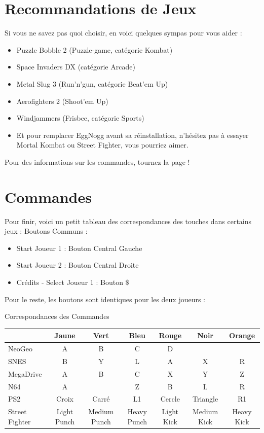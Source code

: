 \documentclass{article}
\begin{document}
\section*{Recommandations de Jeux}
Si vous ne savez pas quoi choisir, en voici quelques sympas pour vous aider : 
\begin{itemize}
    \item Puzzle Bobble 2 (Puzzle-game, catégorie Kombat)
    \item Space Invaders DX (catégorie Arcade)
    \item Metal Slug 3 (Run'n'gun, catégorie Beat'em Up)
    \item Aerofighters 2 (Shoot'em Up)
    \item Windjammers (Frisbee, catégorie Sports)
    \item Et pour remplacer EggNogg avant sa réinstallation, n'hésitez pas à essayer Mortal Kombat ou Street Fighter, vous pourriez aimer. 
\end{itemize}

Pour des informations sur les commandes, tournez la page ! 

\newpage
\section*{Commandes}
Pour finir, voici un petit tableau des correspondances des touches dans certains jeux : 
Boutons Communs : 
\begin{itemize}
    \item Start Joueur 1 : Bouton Central Gauche
    \item Start Joueur 2 : Bouton Central Droite
    \item Crédits - Select Joueur 1 : Bouton \$
\end{itemize}
Pour le reste, les boutons sont identiques pour les deux joueurs : 
\begin{center}
    Correspondances des Commandes
    \begin{tabular}{lcccccc}
        \toprule
        & Jaune & Vert & Bleu & Rouge & Noir & Orange\\
        \midrule
        NeoGeo & A & B & C & D & & \\
        \midrule
        SNES & B & Y & L & A & X & R \\
        \midrule
        MegaDrive & A & B & C & X & Y & Z \\
        \midrule
        N64 & A &  & Z & B & L & R \\
        \midrule
        PS2 & Croix & Carré & L1 & Cercle & Triangle & R1 \\
        \midrule
        Street Fighter & Light Punch & Medium Punch & Heavy Punch & Light Kick & Medium Kick & Heavy Kick\\
        \bottomrule
    \end{tabular}

\end{center}
\end{document}
